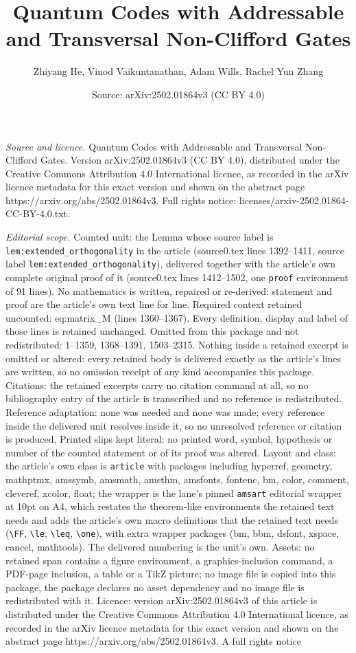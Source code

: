 \documentclass[10pt,a4paper]{amsart}
\title[Quantum Codes with Addressable and Transversal Non-Clifford ]{Quantum Codes with Addressable and Transversal Non-Clifford Gates}
\author{Zhiyang He, Vinod Vaikuntanathan, Adam Wills, Rachel Yun Zhang}
\date{Source: arXiv:2502.01864v3 (CC BY 4.0)}
\begin{document}
\maketitle

\noindent\emph{Source and licence.} Quantum Codes with Addressable and Transversal Non-Clifford Gates. Version arXiv:2502.01864v3 (CC BY 4.0), distributed under the Creative Commons Attribution 4.0 International licence, as recorded in the arXiv licence metadata for this exact version and shown on the abstract page https://arxiv.org/abs/2502.01864v3. Full rights notice: licenses/arxiv-2502.01864-CC-BY-4.0.txt.\par\smallskip

\noindent\textit{Editorial scope.} Counted unit: the Lemma whose source label is \texttt{lem:extended\_orthogonality} in the article (source0.tex lines 1392--1411, source label \texttt{lem:extended\_orthogonality}), delivered together with the article's own complete original proof of it (source0.tex lines 1412--1502, one \texttt{proof} environment of 91 lines). No mathematics is written, repaired or re-derived: statement and proof are the article's own text line for line. Required context retained uncounted: eq:matrix\_M (lines 1360--1367). Every definition, display and label of those lines is retained unchanged. Omitted from this package and not redistributed: 1--1359, 1368--1391, 1503--2315. Nothing inside a retained excerpt is omitted or altered: every retained body is delivered exactly as the article's lines are written, so no omission receipt of any kind accompanies this package. Citations: the retained excerpts carry no citation command at all, so no bibliography entry of the article is transcribed and no reference is redistributed. Reference adaptation: none was needed and none was made; every reference inside the delivered unit resolves inside it, so no unresolved reference or citation is produced. Printed slips kept literal: no printed word, symbol, hypothesis or number of the counted statement or of its proof was altered. Layout and class: the article's own class is \texttt{article} with packages including hyperref, geometry, mathptmx, amssymb, amsmath, amsthm, amsfonts, fontenc, bm, color, comment, cleveref, xcolor, float; the wrapper is the lane's pinned \texttt{amsart} editorial wrapper at 10pt on A4, which restates the theorem-like environments the retained text needs and adds the article's own macro definitions that the retained text needs (\texttt{\textbackslash FF}, \texttt{\textbackslash le}, \texttt{\textbackslash leq}, \texttt{\textbackslash one}), with extra wrapper packages (bm, bbm, dsfont, xspace, cancel, mathtools). The delivered numbering is the unit's own. Assets: no retained span contains a figure environment, a graphics-inclusion command, a PDF-page inclusion, a table or a TikZ picture; no image file is copied into this package, the package declares no asset dependency and no image file is redistributed with it. Licence: version arXiv:2502.01864v3 of this article is distributed under the Creative Commons Attribution 4.0 International licence, as recorded in the arXiv licence metadata for this exact version and shown on the abstract page https://arxiv.org/abs/2502.01864v3. A full rights notice 
\end{document}
